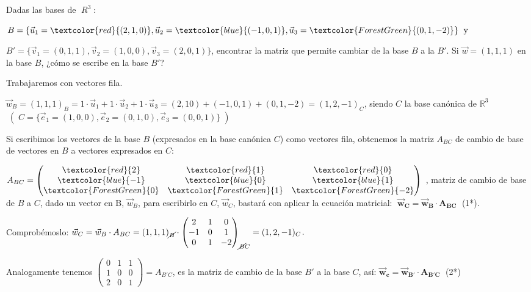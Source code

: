 \begin{ejre}
	Dadas las bases de $\mathbb \; R^3\; : $ 

\noindent $B=\{ \vec u_1=\textcolor{red}{(2,1,0)}, \vec u_2=\textcolor{blue}{(-1,0,1)}, \vec u_3=\textcolor{ForestGreen}{(0,1,-2)} \} \text{\;  y } $

\noindent $B'=\{ \vec v_1=(0,1,1), \vec v_2=(1,0,0), \vec v_3=(2,0,1) \}$, encontrar la matriz que permite cambiar de la base $B$ a la $B'$. Si $\vec w=(1,1,1)$ en la base $B$, ¿cómo se escribe en la base $B'$?
\end{ejre}

\begin{proofw}\renewcommand{\qedsymbol}{$\diamond$}
	Trabajaremos con vectores fila.
	
\noindent $\vec w_B=(1,1,1)_B=1\cdot \vec u_1 +1\cdot \vec u_2 +1\cdot \vec u_3 =(2,10)+(-1,0,1)+(0,1,-2)=(1,2,-1)_C$, siendo $C$ la base canónica de $\mathbb R^3$ \textcolor{gris}{  $\; (\;C=\{ \vec e_1=(1,0,0), \vec e_2=(0,1,0), \vec e_3=(0,0,1) \}\;) $   }

\noindent Si escribimos los vectores de la base $B$ (expresados en la base canónica $C$) como vectores fila, obtenemos la matriz $A_{BC}$ de cambio de base de vectores en $B$ a vectores expresados en $C$:

\noindent $ A_{BC}=\left( \begin{matrix} \textcolor{red}{2}&\textcolor{red}{1}&\textcolor{red}{0}\\ \textcolor{blue}{-1}&\textcolor{blue}{0}&\textcolor{blue}{1}\\ \textcolor{ForestGreen}{0}&\textcolor{ForestGreen}{1}&\textcolor{ForestGreen}{-2} \end{matrix} \right) $ , matriz de cambio de base de $B$ a $C$, dado un vector en B, $\vec w_B$, para escribirlo en $C$, $\vec w_C$, bastará con aplicar la ecuación matricial: $\;\boldsymbol{ \vec w_C=\vec w_B \cdot A_{BC} } \; $ (1*).

\noindent \small{Comprobémoslo: $\vec w_C=\vec w_B \cdot A_{BC}=(1,1,1)_{\cancel{B}}\cdot \left( \begin{matrix} 2&1&0\\-1&0&1\\0&1&-2\end{matrix} \right)_{\cancel{B}C}=(1,2,-1)_C$}\normalsize{.}

\noindent Analogamente tenemos $\left( \begin{matrix} 0&1&1\\1&0&0\\2&0&1 \end{matrix} \right)=A_{B'C} $, es la matriz de cambio de la base $B'$ a la base $C$, así: $\boldsymbol{  \vec w_c=\vec w_{B'}\cdot A_{B'C} }\; $ (2*)


\end{proofw}
